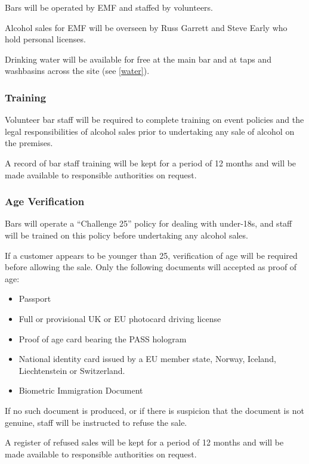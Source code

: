 Bars will be operated by EMF and staffed by volunteers.

Alcohol sales for EMF will be overseen by Russ Garrett and Steve Early who
hold personal licenses.

Drinking water will be available for free at the main bar and at taps and washbasins
across the site (see \cref{water}).

\subsubsection{Training}

Volunteer bar staff will be required to complete training on event policies
and the legal responsibilities of alcohol sales prior to undertaking any sale
of alcohol on the premises. 

A record of bar staff training will be kept for a period of 12 months and
will be made available to responsible authorities on request.

\subsubsection{Age Verification}

Bars will operate a ``Challenge 25'' policy for dealing with under-18s, and staff
will be trained on this policy before undertaking any alcohol sales.

If a customer appears to be younger than 25, verification of age will be required
before allowing the sale. Only the following documents will accepted as proof of age:

\begin{itemize}
\tightlist
\item Passport
\item Full or provisional UK or EU photocard driving license
\item Proof of age card bearing the PASS hologram
\item National identity card issued by a EU member state, Norway, 
    Iceland, Liechtenstein or Switzerland.
\item Biometric Immigration Document
\end{itemize}

If no such document is produced, or if there is suspicion that the document
is not genuine, staff will be instructed to refuse the sale.

A register of refused sales will be kept for a period of 12 months and will
be made available to responsible authorities on request.

